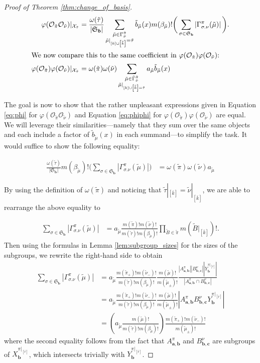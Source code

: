 \documentclass[10pt]{amsart}
\theoremstyle{definition}
\theoremstyle{definition}
\theoremstyle{plain}
\theoremstyle{remark}
\theoremstyle{plain}
\theoremstyle{plain}
\newcommand{\XX}{\mathcal{X}}
\newcommand{\OO}{\mathcal{O}}
\newcommand{\SG}{\mathfrak{S}}
\newcommand{\bfa}{{\boldsymbol{a}}}
\newcommand{\bfb}{{\boldsymbol{b}}}
\newcommand{\bfc}{{\boldsymbol{c}}}
\newcommand{\ttau}{{\tilde{\tau}}}
\newcommand{\tpi}{{\tilde{\pi}}}
\newcommand{\tmu}{{\tilde{\mu}}}
\newcommand{\tnu}{{\tilde{\nu}}}
\newcommand{\tB}{{\tilde{B}}}
\newcommand{\ov}[1]{\bar{#1}}
\newcommand{\ovb}[1]{\left[\ov{#1}\right]}
\newcommand{\ovov}[1]{\bar{\bar{#1}}}
\newcommand{\ovovb}[1]{\left[\ovov{#1}\right]}
\newcommand{\abs}[1]{\left| #1\right |}
\begin{document}
\begin{proof}[Proof of Theorem \ref{thm:change_of_basis}]
\begin{align}
        \varphi(\OO_\tpi\OO_\tnu)|_{\XX_\ttau}&=\frac{\omega(\ttau)}{\abs{\SG_\bfb}}\sum_{\substack{\tmu\in\Gamma^\tpi_\tnu\\\tmu|_{[k]\cup\ovovb{k}}=\ttau}}\tilde{b}_\tmu(x)m(\beta_\tmu)!\bigg(\sum_{\sigma\in\SG_\bfb}\abs{\Gamma^\pi_{\sigma.\nu}(\tmu)}\bigg).\label{eq:phi}\\
        \intertext{We now compare this to the same coefficient in $\varphi(\OO_\tpi)\varphi(\OO_\tnu)$:}
        \varphi(\OO_\tpi)\varphi(\OO_\tnu)|_{\XX_\ttau}&=\omega(\tpi)\omega(\tnu)\sum_{\substack{\tmu\in\tilde\Gamma^\tpi_\tnu\\\tmu|_{[k]\cup\ovovb{k}=\ttau}}}a_\tmu \tilde{b}_\tmu(x)\label{eq:phiphi}
    \end{align}

    The goal is now to show that the rather unpleasant expressions given in Equation \ref{eq:phi} for $\varphi(\OO_\tpi\OO_\tnu)$ and Equation \ref{eq:phiphi} for $\varphi(\OO_\tpi)\varphi(\OO_\tnu)$ are equal. We will leverage their similarities---namely that they sum over the same objects and each include a factor of $\tilde{b}_\tmu(x)$ in each summand---to simplify the task. It would suffice to show the following equality:

    \begin{align*}
        \frac{\omega(\ttau)}{\abs{\SG_\bfb}}m(\beta_\tmu)!\bigg(\sum_{\sigma\in\SG_\bfb}\abs{\Gamma^\pi_{\sigma.\nu}(\tmu)}\bigg)&=\omega(\tpi)\omega(\tnu)a_\tmu
    \end{align*}

    By using the definition of $\omega(\tpi)$ and noticing that $\ttau|_{\ovb{k}}=\tnu|_{\ovb{k}}$, we are able to rearrange the above equality to

    \begin{align*}
        \sum_{\sigma\in\SG_\bfb}\abs{\Gamma^\pi_{\sigma.\nu}(\tmu)}&=a_\tmu\frac{m(\tpi)!m(\tnu)!}{m(\ttau)!m(\beta_\tmu)!}\prod_{\tB\in\tpi}m(\tB|_{\ovb{k}})!.
    \end{align*}
    Then using the formulas in Lemma \ref{lem:subgroup_sizes} for the sizes of the subgroups, we rewrite the right-hand side to obtain
    \begin{align*}
        \sum_{\sigma\in\SG_\bfb}\abs{\Gamma^\pi_{\sigma.\nu}(\tmu)}&=a_\tmu\frac{m(\tpi_+)!m(\tnu_-)!}{m(\ttau)!m(\beta_\tmu)!}\frac{m(\tmu)!}{m(\tmu_\pm)!}\frac{\abs{A^\pi_{\bfa,\bfb}}\abs{B^\nu_{\bfb,\bfc}}\abs{Y_\bfb^{\pi|_{\ovb{r}}}}}{\abs{A_{\bfa,\bfb}^\pi\cap B_{\bfb,\bfc}^\nu}}\\
        &=a_\tmu\frac{m(\tpi_+)!m(\tnu_-)!}{m(\ttau)!m(\beta_\tmu)!}\frac{m(\tmu)!}{m(\tmu_\pm)!}\abs{A_{\bfa,\bfb}^\pi B_{\bfb,\bfc}^\nu Y_\bfb^{\pi|_{\ovb{r}}}}\\
        &=\left(a_\tmu\frac{m(\tmu)!}{m(\ttau)!m(\beta_\tmu)!}\right)\frac{m(\tpi_+)!m(\tnu_-)!}{m(\tmu_\pm)!}
    \end{align*} where the second equality follows from the fact that $A_{\bfa,\bfb}^\pi$ and $B_{\bfb,\bfc}^\nu$ are subgroups of $X_\bfb^{\pi|_{\ovb{r}}}$, which intersects trivially with $Y_\bfb^{\pi|_{\ovb{r}}}$.
    

\end{proof}
\end{document}
